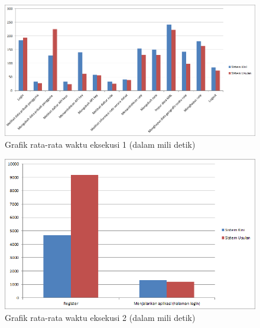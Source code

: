 \begin{figure}[htbp]
	\centering
		\includegraphics[scale=0.6]{Gambar/5_pengujianwaktu_1.png}
	\caption{Grafik rata-rata waktu eksekusi 1 (dalam mili detik)} 
	\label{fig:5_pengujianwaktu_1}
\end{figure}

\begin{figure}[htbp]
	\centering
		\includegraphics[scale=0.7]{Gambar/5_pengujianwaktu_2.png}
	\caption{Grafik rata-rata waktu eksekusi 2 (dalam mili detik)} 
	\label{fig:5_pengujianwaktu_2}
\end{figure}

